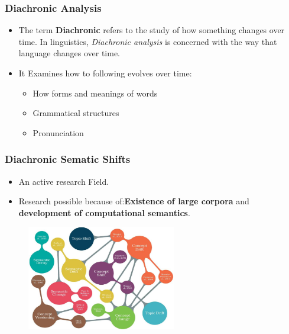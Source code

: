 \documentclass[
    11pt, %
    aspectratio=169, %
]{beamer}
\begin{document}
\begin{frame}
	\frametitle{Diachronic Analysis}
            \begin{itemize}
                \item The term \textbf{Diachronic} refers to the study of how something changes over time. In linguistics,    \textit{Diachronic analysis} is concerned with the way that language changes over time.
                \item It Examines how to following evolves over time:
                 \begin{itemize}
                    \item How forms and meanings of words
                    \item Grammatical structures
                    \item Pronunciation
                \end{itemize}
            \end{itemize}
            
\end{frame}

    \begin{frame}
    \frametitle{Diachronic Sematic Shifts}
    \begin{itemize}
        \item An active research Field.
        \item Research possible because of:\textbf{Existence of large corpora} and \textbf{development of computational semantics}.
    \end{itemize}

    \begin{figure}
        \centering
        \includegraphics[width=6.5cm]{Images/semantic.png}
        \label{fig:my_label}
    \end{figure}
    
\end{frame}
\end{document}

